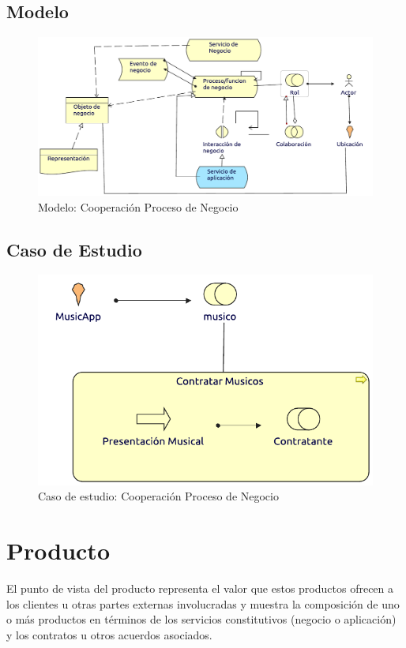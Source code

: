 \subsection{Modelo}
\begin{figure}[h!]
	\centering
	\includegraphics[width=\linewidth]{Arquitectura/Negocio/imgs/ProcesoNegocioMetamodelo.pdf}
	\caption{Modelo: Cooperación Proceso de Negocio}
\end{figure}
\newpage
\subsection{Caso de Estudio}

\begin{figure}[h!]
	\centering
	\includegraphics[width=\linewidth]{Arquitectura/Negocio/imgs/cooperacionProceso.pdf}
	\caption{Caso de estudio:  Cooperación Proceso de Negocio}
\end{figure}
\newpage

\section{Producto}
El punto de vista del producto representa el valor que estos productos ofrecen a los clientes u otras partes externas involucradas y muestra la composición de uno o más productos en términos de los servicios constitutivos (negocio o aplicación) y los contratos u otros acuerdos asociados. \\

